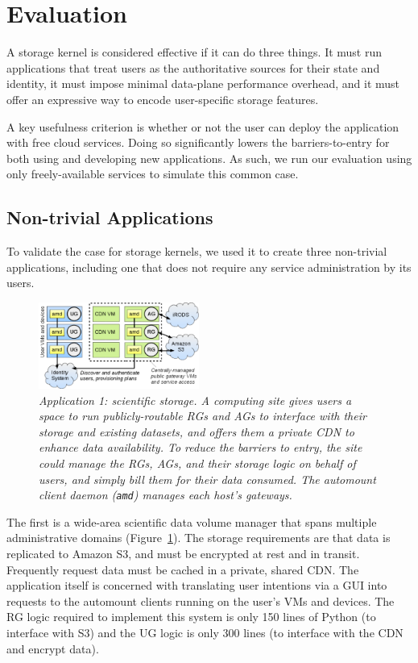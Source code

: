 \section{Evaluation}
\label{sec:evaluation}

A storage kernel is considered effective if it can do three things.  It must
run applications that treat users as the authoritative sources for their state and identity,
it must impose minimal data-plane performance overhead, and it must offer an expressive way to
encode user-specific storage features.

A key usefulness criterion is whether or not the user can deploy the
application with free cloud services.  Doing so significantly lowers the
barriers-to-entry for both using and developing new applications.  As such, we
run our evaluation using only freely-available services to simulate this common
case.

\subsection{Non-trivial Applications}

To validate the case for storage kernels, we used it to create three non-trivial
applications, including one that does not require any service administration by
its users.

\begin{figure}[t!]
\centering
\includegraphics[width=0.47\textwidth]{figures/science-cloud}
\caption{\it Application 1: scientific storage.  A computing site gives users a
   space to run publicly-routable RGs and AGs to interface with their storage
   and existing datasets, and offers them a private CDN to enhance data
   availability.  To reduce the barriers to entry, the site could manage the
   RGs, AGs, and their storage logic on behalf of users, and simply bill them
   for their data consumed.  The automount client daemon (\texttt{amd}) manages
   each host's gateways.}
\label{fig:science-cloud}
\end{figure}


The first is a wide-area scientific data volume manager that spans
multiple administrative domains (Figure~\ref{fig:science-cloud}). The storage requirements are that
data is replicated to Amazon S3, and must be encrypted at rest and in transit.
Frequently request data must be cached in a private, shared CDN. The application
itself is concerned with translating user intentions via a GUI into requests to
the automount clients running on the user's VMs and devices. The RG logic required to
implement this system is only 150 lines of Python (to interface with S3) and the
UG logic is only 300 lines (to interface with the CDN and encrypt data).

